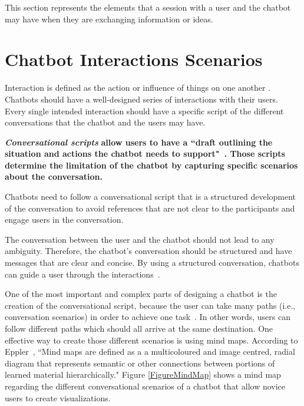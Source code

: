 \documentclass[a4paper,10pt]{article}
\begin{document}
This section represents the elements that a session with a user and the chatbot may have when they are exchanging information or ideas.  

\section{Chatbot Interactions Scenarios}
Interaction is defined as the action or influence of things on one another \cite{merriam-webster}.
Chatbots should have a well-designed series of interactions with their users. Every single intended interaction should have a specific script of the different conversations that the chatbot and the users may have. 

\textbf{\textit{Conversational scripts}} \textbf{allow users to have a ``draft outlining the situation and actions the chatbot needs to support"~\cite{CaseStudy}. Those scripts determine the limitation of the chatbot by capturing specific scenarios about the conversation.} 

Chatbots need to follow a conversational script that is a structured development of the conversation \cite{SmartNotesforBuildingaFeaturedBot} to avoid references that are not clear to the participants and engage users in the conversation.

The conversation between the user and the chatbot should not lead to any ambiguity. Therefore, the chatbot's conversation should be structured and have messages that are clear and concise. By using a structured conversation, chatbots can guide a user through the interactions~\cite{HeuristicsWebPage}.


One of the most important and complex parts of designing a chatbot is the creation of the conversational script, because the user can take many paths (i.e., conversation scenarios) in order to achieve one task~\cite{designChatbotConversatio}. In other words, users can follow different paths which should all arrive at the same destination. One effective way to create those different scenarios is using mind maps. According to Eppler~\cite{eppler2006comparison}, ``Mind maps are defined as a a multicoloured and image centred, radial diagram that represents semantic or other connections between portions of learned material hierarchically." Figure \ref{FigureMindMap} shows a mind map regarding the different conversational scenarios of a chatbot that allow novice users to create visualizations. 
\end{document}
